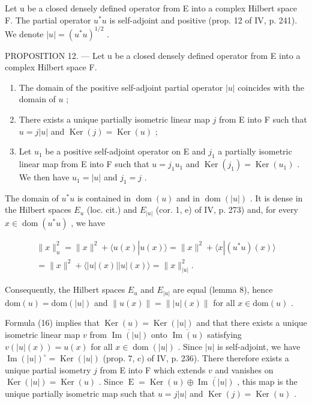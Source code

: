 Let u be a closed densely defined operator from E into a complex Hilbert space F. The partial operator \(u^{*}u\) is self-adjoint and positive (prop. 12 of IV, p. 241). We denote \(|u| = (u^{*}u)^{1/2}\) .

PROPOSITION 12. --- Let u be a closed densely defined operator from E into a complex Hilbert space F.

\begin{enumerate}
\def\labelenumi{\alph{enumi})}
\item
  The domain of the positive self-adjoint partial operator \(|u|\) coincides with the domain of \(u\) ;
\item
  There exists a unique partially isometric linear map \(j\) from E into F such that \(u = j|u|\) and \(\operatorname{Ker}(j) = \operatorname{Ker}(u)\) ;
\item
  Let \(u_{1}\) be a positive self-adjoint operator on E and \(j_{1}\) a partially isometric linear map from E into F such that \(u = j_{1}u_{1}\) and \(\operatorname{Ker}(j_{1}) = \operatorname{Ker}(u_{1})\) . We then have \(u_{1} = |u|\) and \(j_{1} = j\) .
\end{enumerate}

The domain of \(u^{*}u\) is contained in \(\operatorname{dom}(u)\) and in \(\operatorname{dom}(|u|)\) . It is dense in the Hilbert spaces \(E_{u}\) (loc. cit.) and \(E_{|u|}\) (cor. 1, e) of IV, p. 273) and, for every \(x \in \operatorname{dom}(u^{*}u)\) , we have

\[
\begin{array}{c} \| x \| _ {u} ^ {2} = \| x \| ^ {2} + \langle u (x) | u (x) \rangle = \| x \| ^ {2} + \langle x | (u ^ {*} u) (x) \rangle \\ = \| x \| ^ {2} + \langle | u | (x) | | u | (x) \rangle = \| x \| _ {| u |} ^ {2}. \end{array}\tag{16}
\]

Consequently, the Hilbert spaces \(E_{u}\) and \(E_{|u|}\) are equal (lemma 8), hence \(\text{dom}(u) = \text{dom}(|u|)\) and \(\|u(x)\| = \||u|(x)\|\) for all \(x \in \text{dom}(u)\) .

Formula (16) implies that \(\operatorname{Ker}(u) = \operatorname{Ker}(|u|)\) and that there exists a unique isometric linear map \(v\) from \(\overline{\operatorname{Im}(|u|)}\) onto \(\overline{\operatorname{Im}(u)}\) satisfying \(v(|u|(x)) = u(x)\) for all \(x \in \operatorname{dom}(|u|)\) . Since \(|u|\) is self-adjoint, we have \(\operatorname{Im}(|u|)^{\circ} = \operatorname{Ker}(|u|)\) (prop. 7, c) of IV, p. 236). There therefore exists a unique partial isometry \(j\) from E into F which extends \(v\) and vanishes on \(\operatorname{Ker}(|u|) = \operatorname{Ker}(u)\) . Since \(\operatorname{E} = \operatorname{Ker}(u) \oplus \overline{\operatorname{Im}(|u|)}\) , this map is the unique partially isometric map such that \(u = j|u|\) and \(\operatorname{Ker}(j) = \operatorname{Ker}(u)\) .

